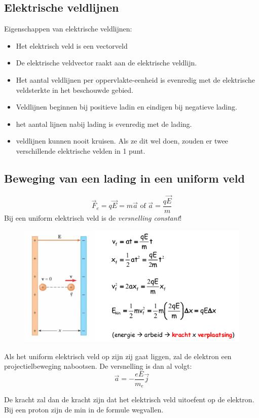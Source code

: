 \documentclass[12pt,a4paper]{article}
\begin{document}
	\subsection{Elektrische veldlijnen}
	Eigenschappen van elektrische veldlijnen:
	\begin{itemize}
		\renewcommand\labelitemi{--}
		\item Het elektrisch veld is een vectorveld
		\item De elektrische veldvector raakt aan de elektrische veldlijn.
		\item Het aantal veldlijnen per oppervlakte-eenheid is evenredig met de elektrische veldsterkte in het beschouwde gebied.
		\item Veldlijnen beginnen bij positieve ladin en eindigen bij negatieve lading.
		\item het aantal lijnen nabij lading is evenredig met de lading.
		\item veldlijnen kunnen nooit kruisen. Als ze dit wel doen, zouden er twee verschillende elektrische velden in 1 punt. 
	\end{itemize}
	\subsection{Beweging van een lading in een uniform veld}
	\[\vec{F}_e = q\vec{E} = m\vec{a} \text{  of  } \vec{a}=\frac{q\vec{E}}{m}\]
	Bij een uniform elektrisch veld is de \textit{versnelling constant}!
	\begin{figure}[h]
		\centering
		\includegraphics[width=0.7\linewidth]{uniform-elektrisch-veld}
		\label{fig:uniform-elektrisch-veld}
	\end{figure}
	Als het uniform elektrisch veld op zijn zij gaat liggen, zal de elektron een projectielbeweging nabootsen. De versnelling is dan al volgt: 
	\[\vec{a}=-\frac{eE}{m_e}\vec{j}\]
	
	De kracht zal dan de kracht zijn dat het elektrisch veld uitoefent op de elektron. Bij een proton zijn de min in de formule wegvallen. 
	
\end{document}
